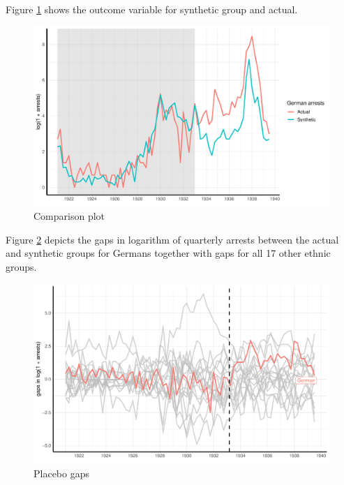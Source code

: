 
Figure \ref{fig_sc_comp_plot} shows the outcome variable for synthetic group and actual.  
\begin{figure}[h]
\centering
\includegraphics[width=\textwidth]{plots/synthetic_control/until_pact/comparison_plot.pdf}
\caption{Comparison plot}
\label{fig_sc_comp_plot}
\end{figure}

Figure \ref{fig_sc_placebo_gaps} depicts the gaps in logarithm of quarterly arrests between the actual and synthetic groups for Germans together with gaps for all 17 other ethnic groups. 
\begin{figure}[h]
\centering
\includegraphics[width=\textwidth]{plots/synthetic_control/until_pact/placebo_highlight_all.pdf}
\caption{Placebo gaps}
\label{fig_sc_placebo_gaps}
\end{figure}

